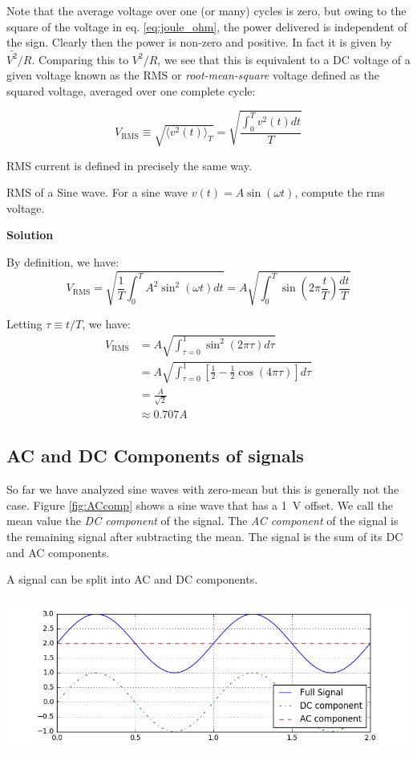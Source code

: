 \documentclass{tufte-book}
\newcommand\Solution{\par\textbf{\textsf{Solution}}\par\medskip}
\begin{document}
Note that the average voltage over one (or many) cycles is zero, but owing to the square of the voltage in eq. \ref{eq:joule_ohm}, the power delivered is independent of the sign. Clearly then the power is non-zero and positive. In fact it is given by $\bar{V^2}/R$. Comparing this to $V^2/R$, we see that this is equivalent to a DC voltage of a given voltage known as the RMS or \textit{root-mean-square} voltage defined as the squared voltage, averaged over one complete cycle:

\begin{equation}\label{def:Vrms}
V_\text{RMS}\equiv \sqrt{\langle v^2(t)\rangle_T} = \sqrt{\frac{\int_0^Tv^2(t)dt}{T}}
\end{equation}

\noindent RMS current is defined in precisely the same way.

\begin{myexample}[label = ex:rms_sine]{RMS of a Sine wave.}
For a sine wave $v(t) = A\sin(\omega t)$, compute the rms voltage.
\Solution
By definition, we have:
$$
V_\text{RMS} = \sqrt{\frac{1}{T}\int_0^TA^2\sin^2(\omega t)dt} = A\sqrt{\int_0^T\sin(2\pi\frac{t}{T}) \frac{dt}{T}}
$$

\noindent Letting $\tau\equiv t/T$, we have:
\begin{align*}
V_\text{RMS} &= A\sqrt{\int_{\tau=0}^1\sin^2 (2\pi \tau) d\tau} \\
&=  A\sqrt{\int_{\tau=0}^1\left[\frac{1}{2}-\frac{1}{2}\cos(4\pi\tau)\right]d\tau} \\
&= \frac{A}{\sqrt{2}} \\
&\approx 0.707A
\end{align*}
\end{myexample}

\subsection{AC and DC Components of signals}
So far we have analyzed sine waves with zero-mean but this is generally not the case. Figure \ref{fig:ACcomp} shows a sine wave that has a 1~V offset. We call the mean value the \textit{DC component} of the signal. The \textit{AC component} of the signal is the remaining signal after subtracting the mean. The signal is the sum of its DC and AC components. 

\begin{marginfigure}
\caption{A signal can be split into AC and DC components.}
\label{fig:ACcomp}
\includegraphics[width=\textwidth]{ACcomp}
\end{marginfigure}
\end{document}
